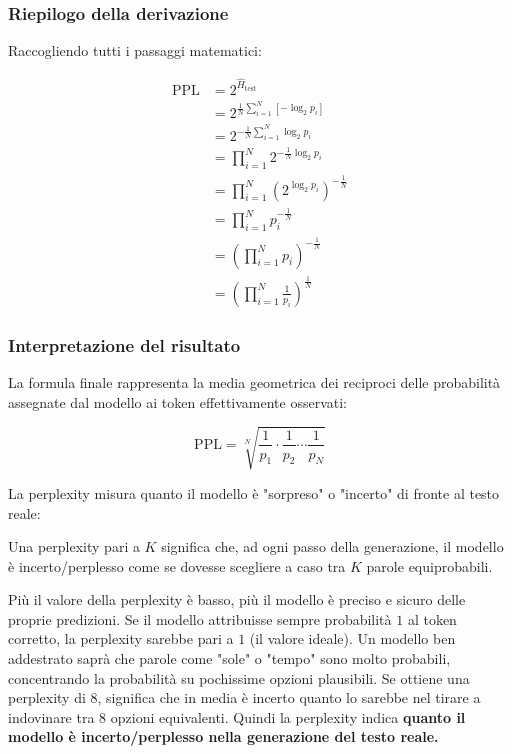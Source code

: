 \subsubsection*{Riepilogo della derivazione}

Raccogliendo tutti i passaggi matematici:

\begin{equation}
    \boxed{
    \begin{aligned}
        \mathrm{PPL}
        &= 2^{\hat{H}_{\text{test}}}\\[6pt]
        &= 2^{\frac{1}{N}
            \sum_{i=1}^{N}[-\log_2 p_i]}\\[6pt]
        &= 2^{-\frac{1}{N}
            \sum_{i=1}^{N}\log_2 p_i}\\[6pt]
        &= \prod_{i=1}^{N}
            2^{-\frac{1}{N}\log_2 p_i}\\[6pt]
        &= \prod_{i=1}^{N}
            \left(2^{\log_2 p_i}\right)^{-\frac{1}{N}}\\[6pt]
        &= \prod_{i=1}^{N}p_i^{-\frac{1}{N}}\\[6pt]
        &= \left(\prod_{i=1}^{N}p_i\right)^{-\frac{1}{N}}\\[6pt]
        &= \left(\prod_{i=1}^{N}\frac{1}{p_i}\right)^{\frac{1}{N}}
    \end{aligned}
    }
\end{equation}

\subsubsection*{Interpretazione del risultato}

La formula finale rappresenta la media geometrica dei
reciproci delle probabilità assegnate dal modello ai token
effettivamente osservati:

\begin{equation}
    \boxed{
        \mathrm{PPL}
        = \sqrt[N]{\frac{1}{p_1}\cdot
          \frac{1}{p_2}\cdots\frac{1}{p_N}}
    }
\end{equation}

La perplexity misura quanto il modello è "sorpreso" o "incerto" di fronte al testo reale:
\begin{center}
    Una perplexity pari a $K$ significa che, ad ogni passo della generazione, il modello è incerto/perplesso come se dovesse scegliere a caso tra $K$ parole equiprobabili.
\end{center}
Più il valore della perplexity è basso, più il modello è preciso e sicuro delle proprie predizioni. Se il modello attribuisse sempre probabilità $1$ al token corretto, la perplexity sarebbe pari a $1$ (il valore ideale).
Un modello ben addestrato saprà che parole come "sole" o "tempo" sono molto probabili, concentrando la probabilità su pochissime opzioni plausibili. Se ottiene una perplexity di $8$, significa che in media è incerto quanto lo sarebbe nel tirare a indovinare tra $8$ opzioni equivalenti.
Quindi la perplexity indica \textbf{quanto il modello è incerto/perplesso nella generazione del testo reale.}

